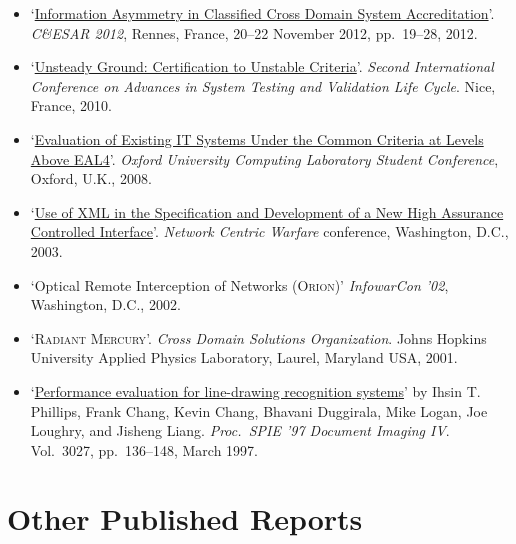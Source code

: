 \documentclass[letterpaper]{article}
\begin{document}
\begin{itemize}
	\item `\href{http://applied-math.org/CESAR2012_information_asymmetry.pdf}{Information
		Asymmetry in Classified Cross Domain System Accreditation}'.  \emph{C\&ESAR 2012},
		Rennes, France, 20--22 November 2012, pp.\ 19--28, 2012.

	\item `\href{http://ieeexplore.ieee.org/xpls/abs_all.jsp?arnumber=5617171&tag=1}{Unsteady
		Ground: Certification to Unstable Criteria}'.  \emph{Second International Conference
		on Advances in System Testing and Validation Life Cycle}. Nice, France, 2010. 

	\item `\href{http://www.cs.ox.ac.uk/files/1328/RR-08-10.pdf}{Evaluation of Existing IT
		Systems Under the Common Criteria at Levels Above EAL4}'. \emph{Oxford University
		Computing Laboratory Student Conference}, Oxford, U.K., 2008.

    \item `\href{https://docs.google.com/viewer?a=v&q=cache:OjDo4H9Pj10J:citeseerx.ist.psu.edu/viewdoc/download%3Fdoi%3D10.1.1.10.4531%26rep%3Drep1%26type%3Dpdf+&hl=en&gl=uk&pid=bl&srcid=ADGEESgzzne2bVzWsUDU4ITF7lKKcGhA_k51PqkEVB7aiZgGgJ65C9VGGFIDIL2TQ_YUcdDO20UNkw-mnwZN71u0JDy5EYltrpjR_If5ZU8yyXc400Izs9ywtAeLkxHyxd02fNek-mj4&sig=AHIEtbQHRLT1rO3Eft0-P1LmHBrZ7zJL7w}{Use
		of XML in the Specification and Development of a New High Assurance Controlled Interface}'.
		\emph{Network Centric Warfare} conference, Washington, D.C., 2003.

    \item `Optical Remote Interception of Networks (\textsc{Orion})'
		\emph{InfowarCon '02}, Washington, D.C., 2002.

    \item `\textsc{Radiant Mercury}'. \emph{Cross Domain Solutions
		Organization}. Johns Hopkins University Applied Physics Laboratory,
		Laurel, Maryland USA, 2001.

    \item `\href{http://proceedings.spiedigitallibrary.org/proceeding.aspx?articleid=920871}{Performance
		evaluation for line-drawing recognition systems}'
		by Ihsin T. Phillips, Frank Chang, Kevin Chang, Bhavani Duggirala,
		Mike Logan, Joe Loughry, and Jisheng Liang. \emph{Proc.\ SPIE '97
		Document Imaging IV}. Vol.\ 3027, pp.\ 136--148, March 1997.
\end{itemize}

\section*{Other Published Reports}
\end{document}
